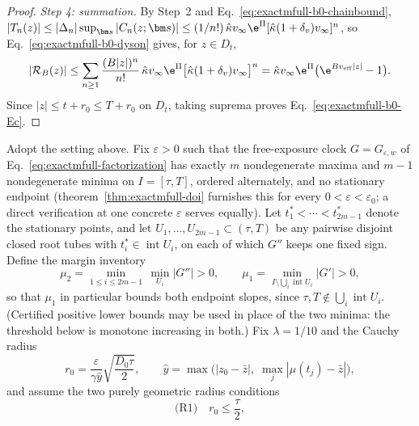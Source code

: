 \begin{proof}
\emph{Step 4: summation.}
By Step~2 and Eq.~\eqref{eq:exactmfull-b0-chainbound},
\(|T_n(z)|\le|\Delta_n|\sup_{\bm s}|C_n(z;\bm s)|
\le(1/n!)\,\hat\kappa v_\infty\e^{\Pi}
[\hat\kappa(1+\delta_v)v_\infty]^n\), so
Eq.~\eqref{eq:exactmfull-b0-dyson} gives, for
\(z\in D_t\),
\begin{equation*}
 |\mathcal R_B(z)|
 \le\sum_{n\ge1}\frac{(B|z|)^n}{n!}\,
 \hat\kappa v_\infty\e^{\Pi}
 \bigl[\hat\kappa(1+\delta_v)v_\infty\bigr]^n
 =\hat\kappa v_\infty\e^{\Pi}
 \bigl(\e^{Bv_{\rm eff}|z|}-1\bigr).
\end{equation*}
Since \(|z|\le t+r_0\le T+r_0\) on \(D_t\), taking suprema proves
Eq.~\eqref{eq:exactmfull-b0-Ec}.
\end{proof}

\begin{proposition}
\label{prop:exactmfull-b0}
Adopt the setting above.  Fix \(\varepsilon>0\) such that the free-exposure
clock \(G=G_{\varepsilon,w}\) of
Eq.~\eqref{eq:exactmfull-factorization} has exactly \(m\) nondegenerate
maxima and \(m-1\) nondegenerate minima on \(I=[\tau,T]\), ordered
alternately, and no stationary endpoint
(theorem~\ref{thm:exactmfull-doi} furnishes this for every
\(0<\varepsilon<\varepsilon_0\); a direct verification at one concrete
\(\varepsilon\) serves equally).  Let \(t_1^*<\cdots<t_{2m-1}^*\) denote
the stationary points, and let
\(U_1,\ldots,U_{2m-1}\subset(\tau,T)\) be any pairwise disjoint closed
root tubes with \(t_i^*\in\operatorname{int}U_i\), on each of which
\(G''\) keeps one fixed sign.  Define the margin inventory
\begin{equation}
 \mu_2=\min_{1\le i\le2m-1}\,\min_{U_i}|G''|>0,
 \qquad
 \mu_1=\min_{I\setminus\bigcup_i\operatorname{int}U_i}|G'|>0,
 \label{eq:exactmfull-b0-margins}
\end{equation}
so that \(\mu_1\) in particular bounds both endpoint slopes, since
\(\tau,T\notin\bigcup_i\operatorname{int}U_i\).  (Certified positive lower
bounds may be used in place of the two minima: the threshold below is
monotone increasing in both.)  Fix \(\lambda=1/10\) and the Cauchy radius
\begin{equation}
 r_0=\frac{\varepsilon}{\gamma\hat y}
 \sqrt{\frac{D_0\tau}{2}},
 \qquad
 \hat y=\max\bigl(|z_0-\bar z|,\;\max_j|\mu(t_j)-\bar z|\bigr),
 \label{eq:exactmfull-b0-r0}
\end{equation}
and assume the two purely geometric radius conditions
\begin{equation}
 \text{(R1)}\quad r_0\le\frac\tau2,

\end{equation}
\end{proposition}
